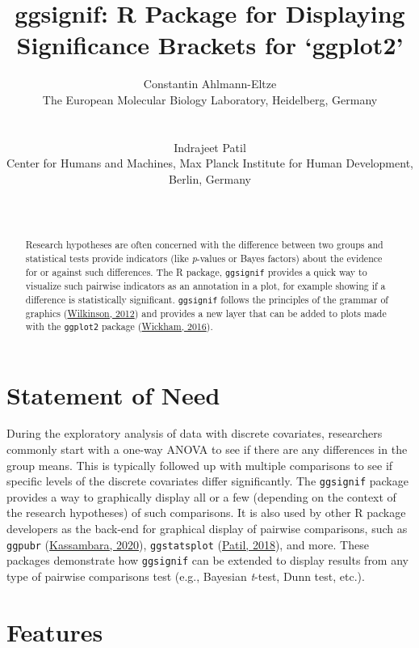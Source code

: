 \documentclass{article}
\title{ggsignif: R Package for Displaying Significance Brackets for
`ggplot2'}
\author{
    Constantin Ahlmann-Eltze
   \\
    The European Molecular Biology Laboratory, Heidelberg, Germany \\
   \\
  \texttt{} \\
   \And
    Indrajeet Patil
   \\
    Center for Humans and Machines, Max Planck Institute for Human
Development, Berlin, Germany \\
   \\
  \texttt{} \\
  }
\begin{document}
\maketitle

\def\tightlist{}


\begin{abstract}
Research hypotheses are often concerned with the difference between two
groups and statistical tests provide indicators (like \emph{p}-values or
Bayes factors) about the evidence for or against such differences. The R
package, \texttt{ggsignif} provides a quick way to visualize such
pairwise indicators as an annotation in a plot, for example showing if a
difference is statistically significant. \texttt{ggsignif} follows the
principles of the grammar of graphics
(\protect\hyperlink{ref-Wilkinson2012}{Wilkinson, 2012}) and provides a
new layer that can be added to plots made with the \texttt{ggplot2}
package (\protect\hyperlink{ref-Wickham2016}{Wickham, 2016}).
\end{abstract}


\hypertarget{statement-of-need}{%
\section{Statement of Need}\label{statement-of-need}}

During the exploratory analysis of data with discrete covariates,
researchers commonly start with a one-way ANOVA to see if there are any
differences in the group means. This is typically followed up with
multiple comparisons to see if specific levels of the discrete
covariates differ significantly. The \texttt{ggsignif} package provides
a way to graphically display all or a few (depending on the context of
the research hypotheses) of such comparisons. It is also used by other R
package developers as the back-end for graphical display of pairwise
comparisons, such as \texttt{ggpubr}
(\protect\hyperlink{ref-Kassambara2020}{Kassambara, 2020}),
\texttt{ggstatsplot} (\protect\hyperlink{ref-Patil2018}{Patil, 2018}),
and more. These packages demonstrate how \texttt{ggsignif} can be
extended to display results from any type of pairwise comparisons test
(e.g., Bayesian \emph{t}-test, Dunn test, etc.).

\hypertarget{features}{%
\section{Features}\label{features}}
\end{document}
